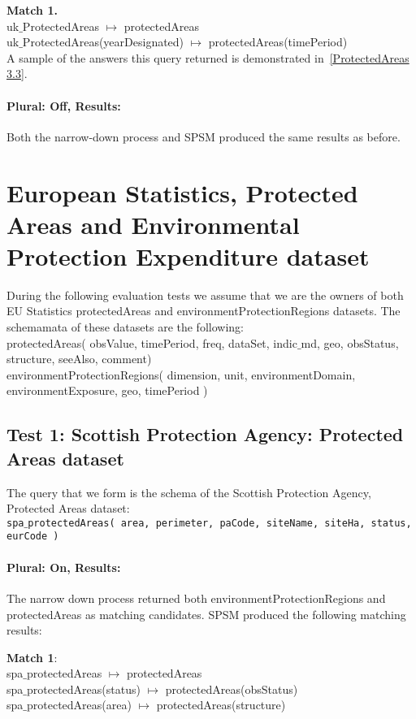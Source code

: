 \documentclass[a4paper,10pt]{article}
\begin{document}
\textbf{Match 1.}\\
uk$\_$ProtectedAreas $\mapsto$ protectedAreas\\
uk$\_$ProtectedAreas(yearDesignated) $\mapsto$ protectedAreas(timePeriod)\\

 A sample of the answers this query returned is demonstrated in~\ref{ProtectedAreas 3.3}.

\paragraph{Plural: Off, Results: } Both the narrow-down process and SPSM produced the same results as before.


\section{European Statistics, Protected Areas and Environmental Protection Expenditure dataset }
During the following evaluation tests we assume that we are the owners of both  EU Statistics protectedAreas and environmentProtectionRegions datasets. 
The schemamata of these datasets are the following:\\
 \indent  protectedAreas( obsValue, timePeriod, freq, dataSet, indic$\_$md, geo, obsStatus, structure, seeAlso, comment) \\
\indent  environmentProtectionRegions( dimension, unit, environmentDomain,  environmentExposure, geo, timePeriod )




\subsection{Test 1: Scottish Protection Agency: Protected Areas dataset}

The query that we form is  the schema of the Scottish Protection Agency, Protected Areas dataset:
\\ \indent \texttt{spa$\_$protectedAreas( area, perimeter, paCode, siteName, siteHa, status, eurCode )}


\paragraph{Plural: On, Results:} The narrow down process returned both environmentProtectionRegions and 
protectedAreas as matching candidates. SPSM produced the following matching results:

\textbf{Match 1}: \\
spa$\_$protectedAreas $\mapsto$ protectedAreas \\
spa$\_$protectedAreas(status) $\mapsto$ protectedAreas(obsStatus)\\
spa$\_$protectedAreas(area) $\mapsto$ protectedAreas(structure)
\end{document}
